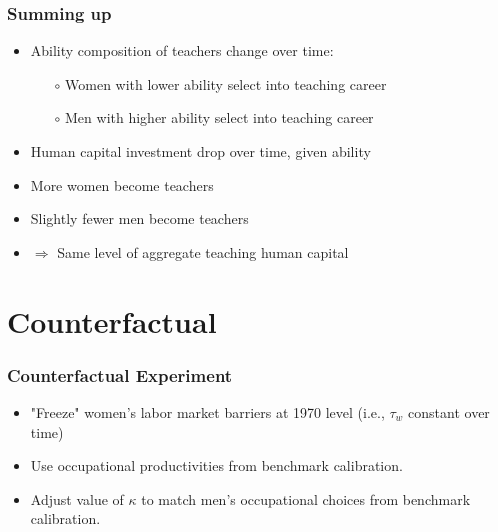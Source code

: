 \documentclass[11pt]{beamer}
\begin{document}
\begin{frame}
\frametitle{Summing up}

\begin{itemize}
    \item Ability composition of teachers change over time:
    \begin{itemize}
				\item[$\circ$] Women with lower ability select into teaching career %
                \item[$\circ$] Men with higher ability select into teaching career %
    \end{itemize}
    \item Human capital investment drop over time, given ability %
    \item More women become teachers
    \item Slightly fewer men become teachers
    \item $\Rightarrow$ Same level of aggregate teaching human capital 
\end{itemize}
\end{frame}

\section{Counterfactual}

\begin{frame}
\frametitle{Counterfactual Experiment}
\begin{itemize}
  \item "Freeze" women's labor market barriers at 1970 level (i.e., $\tau_w$ constant over time)
  \item Use occupational productivities from benchmark calibration.
  \item Adjust value of $\kappa$ to match men's occupational choices from benchmark calibration.
\end{itemize}

\end{frame}
\end{document}
